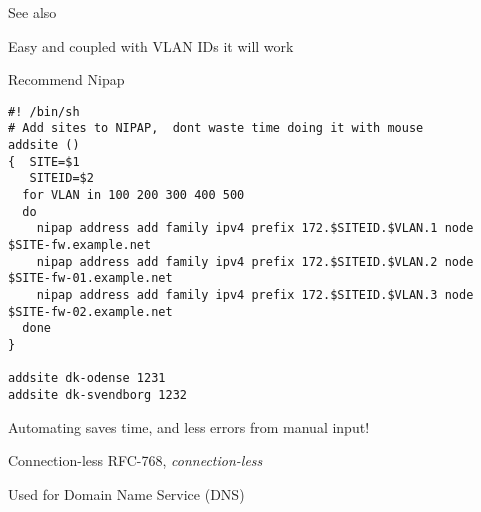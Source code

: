 \documentclass[Screen16to9,17pt]{foils}
\begin{document}


{\footnotesize {}}

See also 




\centerline{Easy and coupled with VLAN IDs it will work \smiley}




\begin{list2}
\item Recommend Nipap 
\end{list2}





\begin{verbatim}
#! /bin/sh
# Add sites to NIPAP,  dont waste time doing it with mouse
addsite ()
{  SITE=$1
   SITEID=$2
  for VLAN in 100 200 300 400 500
  do
    nipap address add family ipv4 prefix 172.$SITEID.$VLAN.1 node $SITE-fw.example.net
    nipap address add family ipv4 prefix 172.$SITEID.$VLAN.2 node $SITE-fw-01.example.net
    nipap address add family ipv4 prefix 172.$SITEID.$VLAN.3 node $SITE-fw-02.example.net
  done
}

addsite dk-odense 1231
addsite dk-svendborg 1232
\end{verbatim}

\begin{list2}
  \item Automating saves time, and less errors from manual input!
\end{list2}

\begin{list1}
\item Connection-less RFC-768, \emph{connection-less}
\item Used for Domain Name Service (DNS)
\end{list1}
\end{document}

